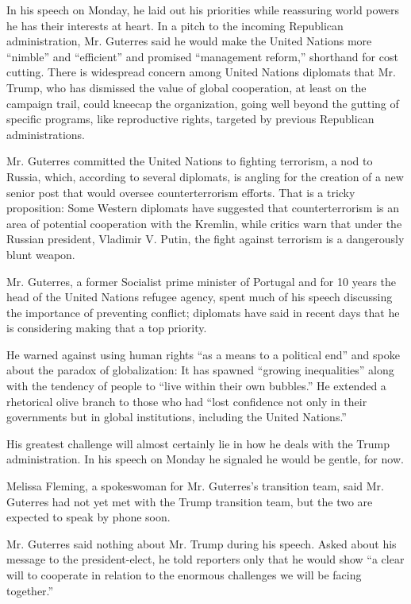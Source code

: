 In his speech on Monday, he laid out his priorities while reassuring
world powers he has their interests at heart. In a pitch to the incoming
Republican administration, Mr. Guterres said he would make the United
Nations more ``nimble'' and ``efficient'' and promised ``management
reform,'' shorthand for cost cutting. There is widespread concern among
United Nations diplomats that Mr. Trump, who has dismissed the value of
global cooperation, at least on the campaign trail, could kneecap the
organization, going well beyond the gutting of specific programs, like
reproductive rights, targeted by previous Republican administrations.

Mr. Guterres committed the United Nations to fighting terrorism, a nod
to Russia, which, according to several diplomats, is angling for the
creation of a new senior post that would oversee counterterrorism
efforts. That is a tricky proposition: Some Western diplomats have
suggested that counterterrorism is an area of potential cooperation with
the Kremlin, while critics warn that under the Russian president,
Vladimir V. Putin, the fight against terrorism is a dangerously blunt
weapon.

Mr. Guterres, a former Socialist prime minister of Portugal and for 10
years the head of the United Nations refugee agency, spent much of his
speech discussing the importance of preventing conflict; diplomats have
said in recent days that he is considering making that a top priority.

He warned against using human rights ``as a means to a political end''
and spoke about the paradox of globalization: It has spawned ``growing
inequalities'' along with the tendency of people to ``live within their
own bubbles.'' He extended a rhetorical olive branch to those who had
``lost confidence not only in their governments but in global
institutions, including the United Nations.''

His greatest challenge will almost certainly lie in how he deals with
the Trump administration. In his speech on Monday he signaled he would
be gentle, for now.

Melissa Fleming, a spokeswoman for Mr. Guterres's transition team, said
Mr. Guterres had not yet met with the Trump transition team, but the two
are expected to speak by phone soon.

Mr. Guterres said nothing about Mr. Trump during his speech. Asked about
his message to the president-elect, he told reporters only that he would
show ``a clear will to cooperate in relation to the enormous challenges
we will be facing together.''

